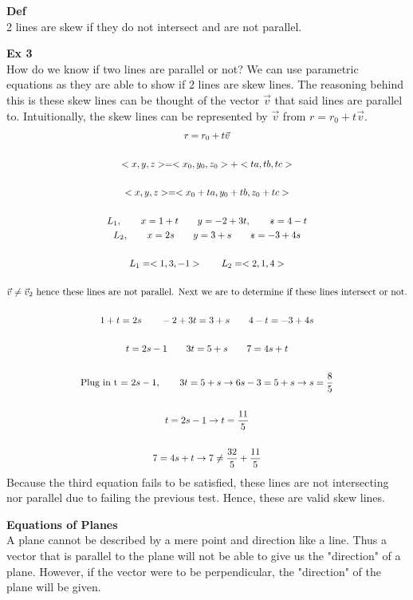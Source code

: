\documentclass{article}
\begin{document}
  \textbf{Def}\\
  2 lines are skew if they do not intersect and are not parallel.

  \textbf{Ex 3}\\
  How do we know if two lines are parallel or not? We can use parametric equations as they are able to show if 2 lines are skew lines. The reasoning behind this is these skew lines can be thought of the vector $ \vec{v} $ that said lines are parallel to. Intuitionally, the skew lines can be represented by $ \vec{v} $ from $ r=r_{0}+t \vec{v}  $.  
  \[
    \begin{gathered}
      r = r_{0}+t \vec{v}\\
      ~\\
      <x,y,z>=<x_{0},y_{0},z_{0}>+<ta,tb,tc>\\
      ~\\
      < x, y, z> = < x_{0}+ta, y_{0}+tb ,z_{0}+tc  >\\
      ~\\
    L_{1},\qquad x=1+t \qquad y=-2+3t, \qquad \zstroke=4-t\\
    L_{2},\qquad x=2s \qquad y=3+s \qquad \zstroke=-3+4s\\
    ~\\
    L_{1}=< 1, 3, -1> \qquad L_{2}=< 2, 1, 4> \\
    ~\\
    \vec{v} \neq \vec{v}_{2} \text{ hence these lines are not parallel. Next we are to determine if these lines intersect or not.}\\
    ~\\
    1+t=2s \qquad -2+3t = 3+s \qquad 4-t=-3+4s\\
    ~\\
    t = 2s-1 \qquad 3t=5+s \qquad 7=4s+t\\
    ~\\
    \text{Plug in t = }2s-1, \qquad 3t=5+s\to 6s-3=5+s \to s= \frac{8}{5}\\
    ~\\
    t=2s-1\to t= \frac{11}{5}\\
    ~\\
    7=4s+t\to 7 \neq \frac{32}{5}+\frac{11}{5}\\
    \end{gathered}
  \]
  Because the third equation fails to be satisfied, these lines are not intersecting nor parallel due to failing the previous test. Hence, these are valid skew lines.

  \textbf{Equations of Planes}\\
  A plane cannot be described by a mere point and direction like a line. Thus a vector that is parallel to the plane will not be able to give us the "direction" of a plane. However, if the vector were to be perpendicular, the "direction" of the plane will be given. 
\end{document}
